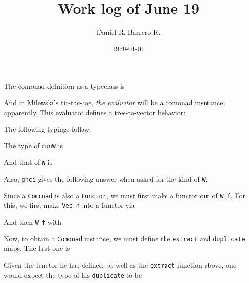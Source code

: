 \documentclass{amsart}
\title{Work log of June 19}
\author{Daniel R. Barrero R.}
\date{\today}
\begin{document}
\maketitle

\section{}

The comonad defnition as a typeclass is



And in Milewski's tic-tac-toe, \emph{the evaluator} will be a comonad insntance,
apparently. This evaluator defines a tree-to-vector behavior:



The following typings follow:

\bigskip

The type of \texttt{runW} is



And that of \texttt{W} is



Also, \texttt{ghci} gives the following answer when asked for the kind of
\texttt{W}:



Since a \texttt{Comonad} is also a \texttt{Functor}, we must first make a
functor out of \texttt{W f}. For this, we first make \texttt{Vec n} into a
functor via



And then \texttt{W f} with



Now, to obtain a \texttt{Comonad} instance, we must define the \texttt{extract}
and \texttt{duplicate} maps. The first one is



Given the functor he has defined, as well as the \texttt{extract} function
above, one would expect the type of his \texttt{duplicate} to be
\end{document}
